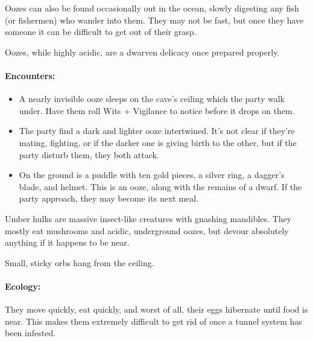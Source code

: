 \begin{multicols}{2}
Oozes can also be found occasionally out in the ocean, slowly digesting any fish (or fishermen) who wander into them.
They may not be fast, but once they have someone it can be difficult to get out of their grasp.

Oozes, while highly acidic, are a dwarven delicacy once prepared properly.

\jelly

\paragraph{Encounters:}

\begin{itemize}

  \item
  A nearly invisible ooze sleeps on the cave's ceiling which the party walk under.
  Have them roll Wits + Vigilance to notice before it drops on them.
  \item
  The party find a dark and lighter ooze intertwined.
  It's not clear if they're mating, fighting, or if the darker one is giving birth to the other, but if the party disturb them, they both attack.
  \item
  On the ground is a puddle with ten gold pieces, a silver ring, a dagger's blade, and helmet.
  This is an ooze, along with the remains of a dwarf.
  If the party approach, they may become its next meal.

\end{itemize}

\jelly

\label{umber_hulk}

Umber hulks are massive insect-like creatures with gnashing mandibles.
They mostly eat mushrooms and acidic, underground oozes, but devour absolutely anything if it happens to be near.

\begin{boxtext}

  Small, sticky orbs hang from the ceiling.

\end{boxtext}

\paragraph{Ecology:}
They move quickly, eat quickly, and worst of all, their eggs hibernate until food is near.
This makes them extremely difficult to get rid of once a tunnel system has been infested.


\end{multicols}
